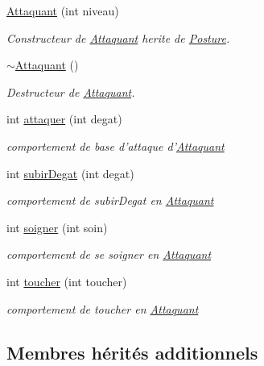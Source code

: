\begin{DoxyCompactItemize}
\item 
\hyperlink{classAttaquant_a0bbfef912ef4d22dcbf823ef4447d732}{Attaquant} (int niveau)
\begin{DoxyCompactList}\small\item\em Constructeur de \hyperlink{classAttaquant}{Attaquant} herite de \hyperlink{classPosture}{Posture}. \end{DoxyCompactList}\item 
\hypertarget{classAttaquant_a121cb6666153876071a1dfaf71eef265}{\hyperlink{classAttaquant_a121cb6666153876071a1dfaf71eef265}{$\sim$\-Attaquant} ()}\label{classAttaquant_a121cb6666153876071a1dfaf71eef265}

\begin{DoxyCompactList}\small\item\em Destructeur de \hyperlink{classAttaquant}{Attaquant}. \end{DoxyCompactList}\item 
int \hyperlink{classAttaquant_ad553f75cefdb44bf0703612940d597e4}{attaquer} (int degat)
\begin{DoxyCompactList}\small\item\em comportement de base d'attaque d'\hyperlink{classAttaquant}{Attaquant} \end{DoxyCompactList}\item 
int \hyperlink{classAttaquant_a3aeb7f6ca8b2397dd98bc52219aab836}{subir\-Degat} (int degat)
\begin{DoxyCompactList}\small\item\em comportement de subir\-Degat en \hyperlink{classAttaquant}{Attaquant} \end{DoxyCompactList}\item 
int \hyperlink{classAttaquant_a874dc43af414df3c3c183e452f29a12a}{soigner} (int soin)
\begin{DoxyCompactList}\small\item\em comportement de se soigner en \hyperlink{classAttaquant}{Attaquant} \end{DoxyCompactList}\item 
int \hyperlink{classAttaquant_adda67392faf5ffc39838a03168f1a591}{toucher} (int toucher)
\begin{DoxyCompactList}\small\item\em comportement de toucher en \hyperlink{classAttaquant}{Attaquant} \end{DoxyCompactList}\end{DoxyCompactItemize}
\subsection*{Membres hérités additionnels}



